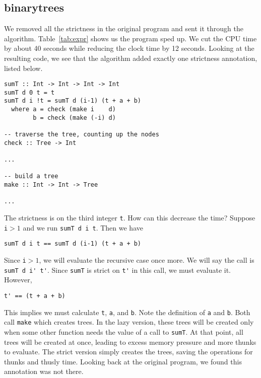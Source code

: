 \documentclass{sigplanconf}
\begin{document}
\subsection{binarytrees}
We removed all the strictness in the original program and sent it through the algorithm. Table~\ref{tab:expr} shows us the program sped up. We cut the CPU time by about 40 seconds while reducing the clock time by 12 seconds. Looking at the resulting code, we see that the algorithm added exactly one strictness annotation, listed below.
\begin{lstlisting}
sumT :: Int -> Int -> Int -> Int
sumT d 0 t = t
sumT d i !t = sumT d (i-1) (t + a + b)
  where a = check (make i    d)
        b = check (make (-i) d)

-- traverse the tree, counting up the nodes
check :: Tree -> Int

...

-- build a tree
make :: Int -> Int -> Tree

...
\end{lstlisting}
The strictness is on the third integer \lstinline!t!. How can this decrease the time? Suppose \lstinline!i!$ > 1$ and we run \lstinline!sumT d i t!. Then we have 
\begin{lstlisting}
sumT d i t == sumT d (i-1) (t + a + b)
\end{lstlisting}
Since \lstinline!i!$ > 1$, we will evaluate the recursive case once more. We will say the call is \lstinline!sumT d i' t'!. Since \lstinline!sumT! is strict on \lstinline!t'! in this call, we must evaluate it. However,
\begin{lstlisting}
t' == (t + a + b)
\end{lstlisting}
This implies we must calculate \lstinline!t!, \lstinline!a!, and \lstinline!b!. Note the definition of \lstinline!a! and \lstinline!b!. Both call \lstinline!make! which creates trees. In the lazy version, these trees will be created only when some other function needs the value of a call to \lstinline!sumT!. At that point, all trees will be created at once, leading to excess memory pressure and more thunks to evaluate. The strict version simply creates the trees, saving the operations for thunks and thusly time. Looking back at the original program, we found this annotation was not there. 
\end{document}
